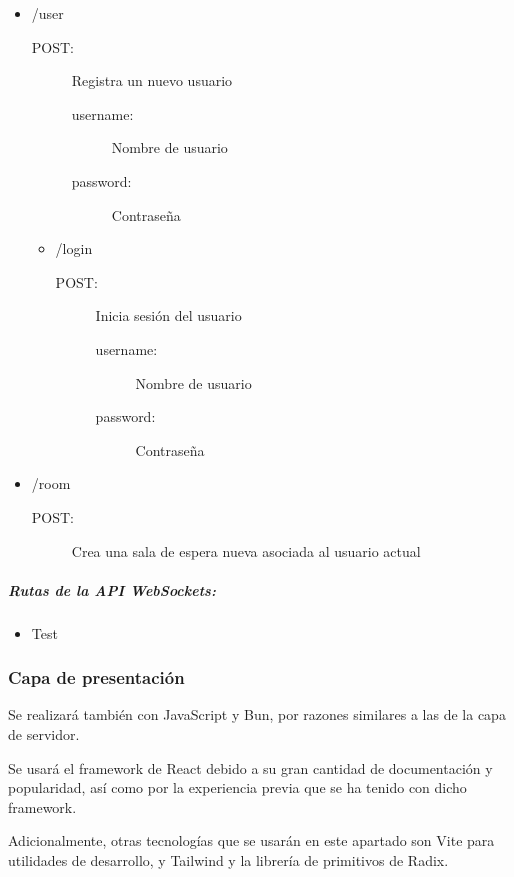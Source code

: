 \begin{itemize}
  \item /user
    \begin{description}
      \item[POST:] Registra un nuevo usuario
        \begin{description}
          \item[username:] Nombre de usuario
          \item[password:] Contraseña
        \end{description}
    \end{description}
    \begin{itemize}
      \item /login
        \begin{description}
          \item[POST:] Inicia sesión del usuario
            \begin{description}
              \item[username:] Nombre de usuario
              \item[password:] Contraseña
            \end{description}
        \end{description}
    \end{itemize}
  \item /room
      \begin{description}
      \item[POST:] Crea una sala de espera nueva asociada al usuario actual
      \end{description}
\end{itemize}
\subparagraph{Rutas de la API WebSockets:}
\begin{itemize}
  \item Test
\end{itemize}

\subsubsection{Capa de presentación}

Se realizará también con JavaScript y Bun, por razones similares a las de la capa de servidor. 

Se usará el framework de React debido a su gran cantidad de documentación y popularidad, así como por la experiencia previa que se ha tenido con dicho framework. 

Adicionalmente, otras tecnologías que se usarán en este apartado son Vite para utilidades de desarrollo, y Tailwind y la librería de primitivos de Radix. 

